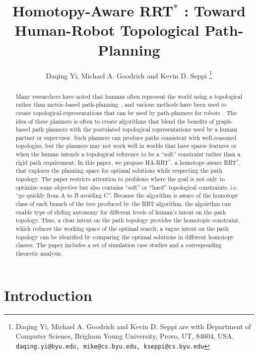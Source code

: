 \documentclass[letterpaper, 10 pt, conference]{ieeeconf}
\title{\LARGE \bf
Homotopy-Aware RRT$^{*}$ : Toward Human-Robot Topological Path-Planning
}
\author{
Daqing Yi, Michael A. Goodrich and Kevin D. Seppi
\thanks{Daqing Yi, Michael A. Goodrich and Kevin D. Seppi are with Department of Computer Science, Brigham Young University, Provo, UT, 84604, USA.
{\tt\small daqing.yi@byu.edu, mike@cs.byu.edu, kseppi@cs.byu.edu} }
}
\begin{document}
\maketitle
\thispagestyle{empty}
\pagestyle{empty}


\begin{abstract}
Many researchers have noted that humans often represent the world using a topological rather than metric-based path-planning~\cite{kuipers99,aginsky1997two}, and various methods have been used to create topological-representations that can be used by path-planners for robots~\cite{mataric1992integration,thrun1998learning,fasola2013modeling,shah2013qualitative}.  
The idea of these planners is often to create algorithms that blend the benefits of graph-based path planners with the postulated topological representations used by a human partner or supervisor.
Such planners can produce paths consistent with well-reasoned topologies, but the planners may not work well in worlds that have sparse features or when the human intends a topological reference to be a ``soft'' constraint rather than a rigid path requirement. 
In this paper, we propose HA-RRT$^{*}$, a homotopy-aware RRT$^{*}$, that explores the planning space for optimal solutions while respecting the path topology.
The paper restricts attention to problems where the goal is not only to optimize some objective but also contains ``soft'' or ``hard'' topological constraints, i.e. ``go quickly from A to B avoiding C''.
Because the algorithm is aware of the homotopy class of each branch of the tree produced by the RRT algorithm, the algoirthm can enable type of sliding autonomy for different levels of human's intent on the path topology.
Thus, a clear intent on the path topology provides the homotopic constraint, which reduces the working space of the optimal search; a vague intent on the path topology can be identified by comparing the optimal solutions in different homotopy classes.
The paper includes a set of simulation case studies and a corresponding theoretic analysis.
\end{abstract}

\section{Introduction}
\label{sec:intro}
\end{document}
